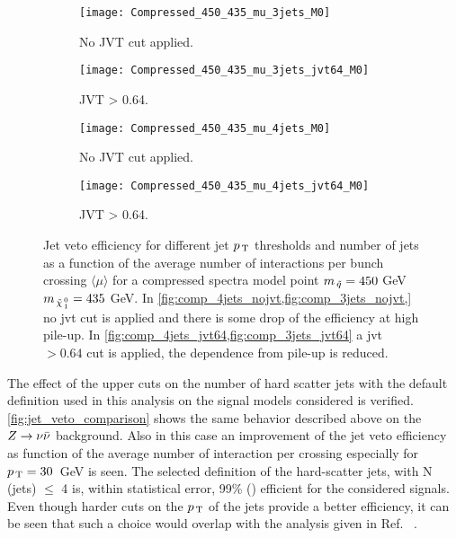 \begin{figure}[!h]
  \centering
  \begin{subfigure}[t]{.48\linewidth}
    \texttt{[image: Compressed\_450\_435\_mu\_3jets\_M0]}
    \caption{No JVT cut applied.}
    \label{fig:comp_3jets_nojvt}
  \end{subfigure}
  \begin{subfigure}[t]{.48\linewidth}
    \texttt{[image: Compressed\_450\_435\_mu\_3jets\_jvt64\_M0]}
    \caption{JVT > 0.64.}
    \label{fig:comp_3jets_jvt64}
  \end{subfigure}
  \begin{subfigure}[t]{.48\linewidth}
    \texttt{[image: Compressed\_450\_435\_mu\_4jets\_M0]}
    \caption{No JVT cut applied.}
    \label{fig:comp_4jets_nojvt}
  \end{subfigure}
  \begin{subfigure}[t]{.48\linewidth}
    \texttt{[image: Compressed\_450\_435\_mu\_4jets\_jvt64\_M0]}
    \caption{JVT > 0.64.}
    \label{fig:comp_4jets_jvt64}
  \end{subfigure}
  \caption{Jet veto efficiency for different jet $p_\mathrm{\, T}$ thresholds and number of
    jets as a function of the average number of interactions per bunch crossing
    $\langle \mu \rangle$ for a compressed spectra model point $m_{\, \tilde{q}} = 450$
    GeV $m_{\, \tilde{\chi}_{\, 1}^{\, 0}} = 435$ GeV. In
    \cref{fig:comp_4jets_nojvt,fig:comp_3jets_nojvt,} no \gls{jvt} cut is
    applied and there is some drop of the efficiency at high pile-up. In
    \cref{fig:comp_4jets_jvt64,fig:comp_3jets_jvt64} a \gls{jvt} $> 0.64$ cut is
    applied, the dependence from pile-up is reduced.}
  \label{fig:comp_eff}
\end{figure}
The effect of the upper cuts on the number of hard scatter jets with the default
definition used in this analysis on the signal models considered is
verified. \cref{fig:jet_veto_comparison} shows the same behavior described above
on the $Z \rightarrow \nu \bar{\nu}$ background. Also in this case an improvement of the jet veto
efficiency as function of the average number of interaction per crossing
especially for $p_\mathrm{\, T} = 30$~GeV is seen. The selected definition of the
hard-scatter jets, with N (jets) $\leq$ 4 is, within statistical error, 99\%
() efficient for the considered signals. Even
though harder cuts on the $p_\mathrm{\, T}$ of the jets provide a better efficiency, it can
be seen that such a choice would overlap with the analysis given in
Ref.~\cite{MultijetSUSY} .
